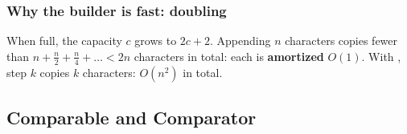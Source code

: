 \documentclass[aspectratio=169,10pt,compress]{beamer}
\begin{document}
\begin{frame}[t,fragile] \frametitle{Why the builder is fast: doubling}

  \vspace{0.3em}
  \small 
  When full, the capacity $c$ grows to $2c + 2$. 
  Appending $n$ characters copies fewer than
  $n + \frac{n}{2} + \frac{n}{4} + \dots < 2n$ characters in total: 
  each  is \textbf{amortized} $O(1)$.
  With \hCode{+=}, step $k$ copies $k$ characters: 
  $O(n^{2})$ in total.
\end{frame}


\subsection[Comparators]{Comparable and Comparator}
\end{document}
